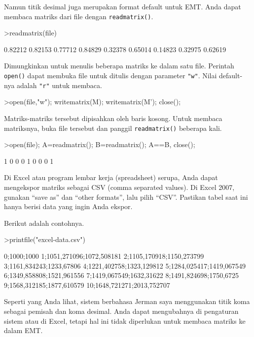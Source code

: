 \documentclass[a4paper,11pt,oneside,enabledeprecatedfontcommands]{scrbook}
\newenvironment{eulernotebook}{}{}
\newenvironment{eulercomment}{\par\medskip\noindent}{\par\medskip}
\begin{document}
\begin{eulernotebook}
\begin{eulercomment}
			Namun titik desimal juga merupakan format default untuk EMT. Anda dapat membaca matriks dari file
			dengan \texttt{readmatrix()}.
		\end{eulercomment}
		\begin{eulerprompt}
			>readmatrix(file)
		\end{eulerprompt}
		\begin{euleroutput}
			  0.82212   0.82153   0.77712 
			  0.84829   0.32378   0.65014 
			  0.14823   0.32975   0.62619 
		\end{euleroutput}
		\begin{eulercomment}
			Dimungkinkan untuk menulis beberapa matriks ke dalam satu file. Perintah \texttt{open()} dapat membuka file
			untuk ditulis dengan parameter \texttt{"w"}. Nilai default-nya adalah \texttt{"r"} untuk membaca.
		\end{eulercomment}
		\begin{eulerprompt}
			>open(file,"w"); writematrix(M); writematrix(M'); close();
		\end{eulerprompt}
		\begin{eulercomment}
			Matriks-matriks tersebut dipisahkan oleh baris kosong. Untuk membaca matriksnya, buka file tersebut
			dan panggil \texttt{readmatrix()} beberapa kali.
		\end{eulercomment}
		\begin{eulerprompt}
			>open(file); A=readmatrix(); B=readmatrix(); A==B, close();
		\end{eulerprompt}
		\begin{euleroutput}
			        1         0         0 
			        0         1         0 
			        0         0         1 
		\end{euleroutput}
		\begin{eulercomment}
			Di Excel atau program lembar kerja (spreadsheet) serupa, Anda dapat mengekspor matriks sebagai CSV
			(comma separated values). Di Excel 2007, gunakan ``save as'' dan ``other formats'', lalu pilih ``CSV''.
			Pastikan tabel saat ini hanya berisi data yang ingin Anda ekspor.
			
			Berikut adalah contohnya.
		\end{eulercomment}
		\begin{eulerprompt}
			>printfile("excel-data.csv")
		\end{eulerprompt}
		\begin{euleroutput}
			0;1000;1000
			1;1051,271096;1072,508181
			2;1105,170918;1150,273799
			3;1161,834243;1233,67806
			4;1221,402758;1323,129812
			5;1284,025417;1419,067549
			6;1349,858808;1521,961556
			7;1419,067549;1632,31622
			8;1491,824698;1750,6725
			9;1568,312185;1877,610579
			10;1648,721271;2013,752707
		\end{euleroutput}
		\begin{eulercomment}
			Seperti yang Anda lihat, sistem berbahasa Jerman saya menggunakan titik koma sebagai pemisah dan koma
			desimal. Anda dapat mengubahnya di pengaturan sistem atau di Excel, tetapi hal ini tidak diperlukan
			untuk membaca matriks ke dalam EMT.
			

\end{eulercomment}
\end{eulernotebook}
\end{document}
